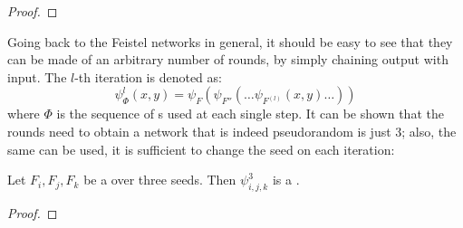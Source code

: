 \begin{proof}
\end{proof}

Going back to the Feistel networks in general, it should be easy to see that they can be made of an arbitrary number of rounds, by simply chaining output with input. The $l$-th iteration is denoted as: 
\[
    \psi^l_\Phi(x, y) = \psi_{F}(\psi_{F''}( \ldots \psi_{F^{(l)}}(x, y) \ldots ))
\]
where $\Phi$ is the sequence of \prf{}s used at each single step. It can be shown that the rounds need to obtain a network that is indeed pseudorandom is just 3; also, the same \prf{} can be used, it is sufficient to change the seed on each iteration\footnotemark:

\begin{theorem}
    Let $F_i, F_j, F_k$ be a \prf{} over three seeds. Then $\psi^3_{i, j, k}$ is a \prp.
\end{theorem}


\begin{proof}
\end{proof}